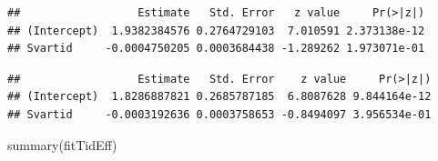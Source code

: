 \documentclass[
]{article}
\newenvironment{Shaded}{\begin{snugshade}}{\end{snugshade}}
\newcommand{\AttributeTok}[1]{\textcolor[rgb]{0.77,0.63,0.00}{#1}}
\newcommand{\CommentTok}[1]{\textcolor[rgb]{0.56,0.35,0.01}{\textit{#1}}}
\newcommand{\DecValTok}[1]{\textcolor[rgb]{0.00,0.00,0.81}{#1}}
\newcommand{\FunctionTok}[1]{\textcolor[rgb]{0.00,0.00,0.00}{#1}}
\newcommand{\NormalTok}[1]{#1}
\newcommand{\OtherTok}[1]{\textcolor[rgb]{0.56,0.35,0.01}{#1}}
\newcommand{\SpecialCharTok}[1]{\textcolor[rgb]{0.00,0.00,0.00}{#1}}
\newcommand{\StringTok}[1]{\textcolor[rgb]{0.31,0.60,0.02}{#1}}
\begin{document}
\begin{Shaded}
\end{Shaded}

\begin{verbatim}
##                  Estimate   Std. Error   z value     Pr(>|z|)
## (Intercept)  1.9382384576 0.2764729103  7.010591 2.373138e-12
## Svartid     -0.0004750205 0.0003684438 -1.289262 1.973071e-01
\end{verbatim}

\begin{Shaded}
\end{Shaded}

\begin{verbatim}
##                  Estimate   Std. Error    z value     Pr(>|z|)
## (Intercept)  1.8286887821 0.2685787185  6.8087628 9.844164e-12
## Svartid     -0.0003192636 0.0003758653 -0.8494097 3.956534e-01
\end{verbatim}

\begin{Shaded}
\begin{Highlighting}[]
\FunctionTok{summary}\NormalTok{(fitTidEff)}
\end{Highlighting}
\end{Shaded}
\end{document}
